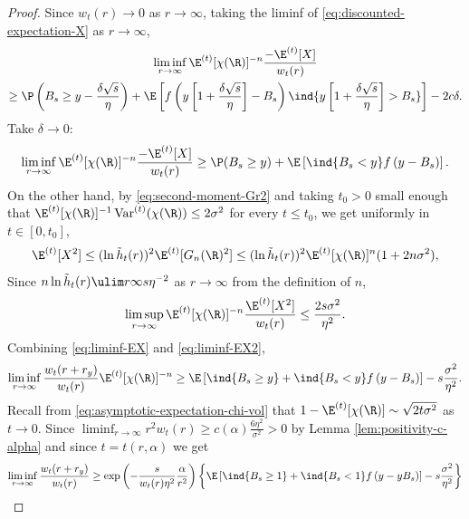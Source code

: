 \documentclass[10pt,a4paper]{article}
\DeclareMathOperator{\Var}{Var}
\begin{document}
\begin{proof}
Since $w_t(r)\to 0$ as $r\to\infty$, taking the liminf of \eqref{eq:discounted-expectation-X} as $r\to\infty$, 
\begin{multline*}
\liminf_{r\to\infty} \E^{(t)}[\chi(\R)]^{-n} \frac{-\E^{(t)}[X]}{w_t(r)} \\
\geq \P\left(B_s \geq y-\frac{\delta\sqrt{s}}{\eta} \right) + \E\left[ f\left( y\left[ 1 + \frac{\delta\sqrt{s}}{\eta} \right] - B_s \right) \ind{y\left[ 1 + \frac{\delta\sqrt{s}}{\eta} \right] > B_s} \right] - 2c\delta .
\end{multline*}
Take $\delta\to 0$:
\begin{equation}\label{eq:liminf-EX}
\liminf_{r\to\infty} \E^{(t)}[\chi(\R)]^{-n} \frac{-\E^{(t)}[X]}{w_t(r)}
\geq \P(B_s\geq y) + \E\left[\ind{B_s < y} f\left(y-B_s\right)\right] .
\end{equation}
On the other hand, by \eqref{eq:second-moment-Gr2} 
and taking $t_0>0$ small enough that $\E^{(t)}[\chi(\R)]^{-1} \Var^{(t)}(\chi(\R))\leq 2\sigma^2$ for every $t\leq t_0$, 
we get uniformly in $t\in[0,t_0]$, 
\begin{align*}
\E^{(t)}[X^2] \leq (\ln \tilde h_t(r))^2 \E^{(t)}[G_n(\R)^2] \leq (\ln \tilde h_t(r))^2 \E^{(t)}[\chi(\R)]^n (1+2n\sigma^2) ,
\end{align*}
Since $n \ln \tilde h_t(r) \ulim r \infty s \eta^{-2}$ as $r\to\infty$ from the definition of $n$, 
\begin{equation}\label{eq:liminf-EX2}
\limsup_{r\to\infty} \E^{(t)}[\chi(\R)]^{-n} \frac{\E^{(t)}[X^2]}{w_t(r)} \leq \frac{2 s \sigma^2}{\eta^2} .
\end{equation}
Combining \eqref{eq:liminf-EX} and \eqref{eq:liminf-EX2}, 
\begin{equation}\label{eq:2why-t-must-vary}
\liminf_{r\to\infty} \frac{w_t(r+r_y)}{w_t(r)} \E^{(t)}[\chi(\R)]^{-n} 
\geq \E\left[ \ind{B_s\geq y} + \ind{B_s<y} f\left(y-B_s\right)\right] - s \frac{\sigma^2}{\eta^2} . 
\end{equation}
Recall from \eqref{eq:asymptotic-expectation-chi-vol} that $1-\E^{(t)}[\chi(\R)] \sim \sqrt{2t\sigma^2}$ as $t\to 0$. Since $\liminf_{r\to\infty} r^2 w_t(r) \geq c(\alpha) \frac{6\eta^2}{\sigma^2} > 0$ by Lemma \ref{lem:positivity-c-alpha} and since $t = t(r,\alpha)$ we get 
\begin{align*}
\liminf_{r\to\infty} \frac{w_t(r+r_y)}{w_t(r)} &\geq \exp\left(- \frac{s}{w_t(r) \eta^2}\frac{\alpha}{r^2} \right) \left\{ \E\left[ \ind{B_s\geq 1} + \ind{B_s<1} f\left(y-yB_s\right)\right] - s \frac{\sigma^2}{\eta^2} \right \} \\

\end{align*}
\end{proof}
\end{document}
